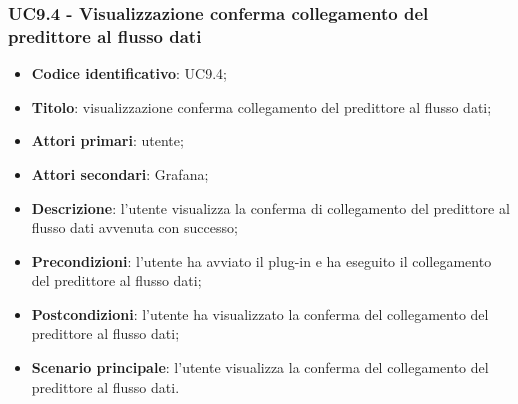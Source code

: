 \subsubsection{UC9.4 - Visualizzazione conferma collegamento del predittore al flusso dati}
\begin{itemize}
	\item \textbf{Codice identificativo}: UC9.4;
	\item \textbf{Titolo}: visualizzazione conferma collegamento del predittore al flusso dati;
	\item \textbf{Attori primari}: utente;
	\item \textbf{Attori secondari}: Grafana\glo;
	\item \textbf{Descrizione}: l'utente visualizza la conferma di collegamento del predittore al flusso dati avvenuta con successo;
	\item \textbf{Precondizioni}: l'utente ha avviato il plug-in e ha eseguito il collegamento del predittore al flusso dati;
	\item \textbf{Postcondizioni}: l'utente ha visualizzato la conferma del collegamento del predittore al flusso dati;
	\item \textbf{Scenario principale}: l'utente visualizza la conferma del collegamento del predittore al flusso dati.
\end{itemize}